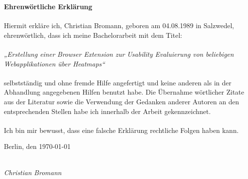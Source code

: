 \documentclass[
	bibliography=totoc,
	listof=totoc,							%
	BCOR=5mm,							%
	DIV=12]{scrbook}
\begin{document}
\vspace*{1cm}

\noindent
{\Huge \textbf{Ehrenwörtliche Erklärung}}\\
\\
Hiermit erkläre ich, Christian Bromann, geboren am 04.08.1989 in Salzwedel, ehrenwörtlich, dass ich meine Bachelorarbeit mit dem Titel:\\
\\
\textit{„Erstellung einer Browser Extension zur Usability Evaluierung von beliebigen Webapplikationen über Heatmaps“}\\
\\
selbstständig und ohne fremde Hilfe angefertigt und keine anderen als in der Abhandlung angegebenen Hilfen benutzt habe.
Die Übernahme wörtlicher Zitate aus der Literatur sowie die Verwendung der Gedanken anderer Autoren an den entsprechenden Stellen habe ich innerhalb der Arbeit gekennzeichnet.\\
\\
Ich bin mir bewusst, dass eine falsche Erklärung rechtliche Folgen haben kann.

\vspace{2cm}

\noindent
Berlin, den \today

\vspace{3cm}

\hspace*{7cm}%
\dotfill\\
\hspace*{9.5cm}%
\textit{Christian Bromann}
\end{document}
